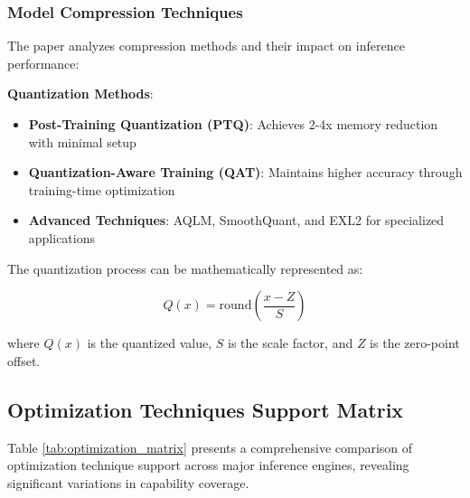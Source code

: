 \documentclass[12pt,a4paper]{article}
\begin{document}
\subsubsection{Model Compression Techniques}

The paper analyzes compression methods and their impact on inference performance:

\textbf{Quantization Methods}:
\begin{itemize}
    \item \textbf{Post-Training Quantization (PTQ)}: Achieves 2-4x memory reduction with minimal setup
    \item \textbf{Quantization-Aware Training (QAT)}: Maintains higher accuracy through training-time optimization
    \item \textbf{Advanced Techniques}: AQLM, SmoothQuant, and EXL2 for specialized applications
\end{itemize}

The quantization process can be mathematically represented as:

\begin{equation}
Q(x) = \text{round}\left(\frac{x - Z}{S}\right)
\end{equation}

where $Q(x)$ is the quantized value, $S$ is the scale factor, and $Z$ is the zero-point offset.

\subsection{Optimization Techniques Support Matrix}

Table \ref{tab:optimization_matrix} presents a comprehensive comparison of optimization technique support across major inference engines, revealing significant variations in capability coverage.
\end{document}
